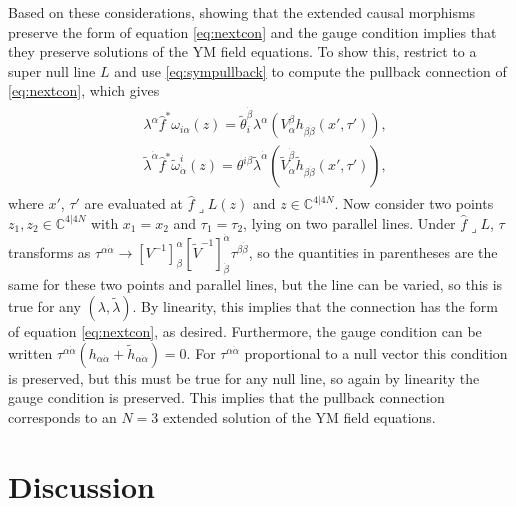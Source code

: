\documentclass[12pt]{article}
\newcommand{\mbb}{\mathbb}
\newcommand{\spoint}{z}
\begin{document}
Based on these considerations, showing that the extended causal morphisms preserve the form of equation \eqref{eq:nextcon} and the gauge condition implies that they preserve solutions of the YM field equations. To show this, restrict to a super null line $L$ and use \eqref{eq:sympullback} to compute the pullback connection of \eqref{eq:nextcon}, which gives
\begin{align}\label{eq:ompullback}
\begin{split}
&\lambda^\alpha \hat{f}^*\omega_{i\alpha}(\spoint)=\tilde{\theta}_i^{\dot{\beta}}\lambda^\alpha \left(V^\beta_{\alpha}h_{\beta\dot{\beta}}(x',\tau')\right), \\
 &\tilde{\lambda}^{\dot{\alpha}} \hat{f}^*\tilde{\omega}^i_{\dot{\alpha}}(\spoint) =\theta^{i\beta}\tilde{\lambda}^{\dot{\alpha}} \left(\tilde{V}^{\dot{\beta}}_{ \dot{\alpha}}\tilde{h}_{\beta\dot{\beta}}(x',\tau')\right),
\end{split}
\end{align}
where $x'$, $\tau'$ are evaluated at $\hat{f}\lrcorner L(\spoint)$ and $z\in \mbb{C}^{4\vert 4N}$.  Now consider two points $\spoint_1,\spoint_2\in \mbb{C}^{4\vert 4N}$ with $x_1=x_2$ and $\tau_1=\tau_2$, lying on two parallel lines.  Under $\hat{f}\lrcorner L$, $\tau$ transforms as $\tau^{\alpha\dot{\alpha}}\rightarrow [V^{-1}]^\alpha_\beta [\tilde{V}^{-1}]^{\dot{\alpha}}_{\dot{\beta}}\tau^{\beta\dot{\beta}}$, so the quantities in parentheses are the same for these two points and parallel lines, but the line can be varied, so this is true for any $(\lambda, \tilde{\lambda})$.  By linearity, this implies that the connection has the form of equation \eqref{eq:nextcon}, as desired. Furthermore, the gauge condition can be written $\tau^{\alpha\dot{\alpha}}(h_{\alpha\dot{\alpha}}+\tilde{h}_{\alpha\dot{\alpha}})=0$.  For $\tau^{\alpha\dot{\alpha}}$ proportional to a null vector this condition is preserved, but this must be true for any null line, so again by linearity the gauge condition is preserved.  This implies that the pullback connection corresponds to an $N=3$ extended solution of the YM field equations. 


\section{Discussion}
\end{document}

